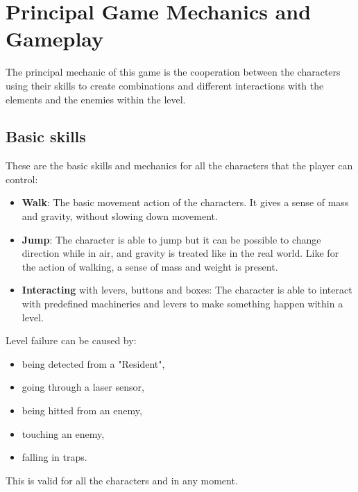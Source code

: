 \documentclass[12pt, a4paper]{report}
\begin{document}
\chapter{Principal Game Mechanics and Gameplay}
The principal mechanic of this game is the cooperation between the characters using their skills to create combinations and different interactions with the elements and the enemies within the level.

\section*{Basic skills}
These are the basic skills and mechanics for all the characters that the player can control:
\begin{itemize}
	\item \textbf{Walk}: The basic movement action of the characters. It gives a sense of mass and gravity, without slowing down movement.
	\item \textbf{Jump}: The character is able to jump but it can be possible to change direction while in air, and gravity is treated like in the real world. Like for the action of walking, a sense of mass and weight is present. 
	\item \textbf{Interacting} with levers, buttons and boxes: The character is able to interact with predefined machineries and levers to make something happen within a level.
\end{itemize}

Level failure can be caused by:
\begin{itemize}
	\item being detected from a "Resident",
	\item going through a laser sensor,
	\item being hitted from an enemy,
	\item touching an enemy,
	\item falling in traps.
\end{itemize}
This is valid for all the characters and in any moment.
\end{document}
